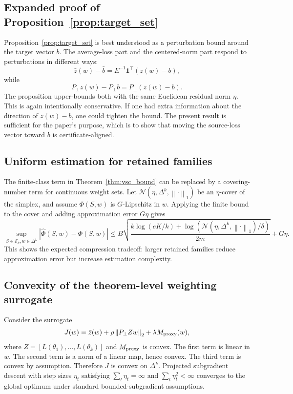 \documentclass{article}
\theoremstyle{definition}
\newcommand{\cN}{\mathcal{N}}
\newcommand{\cS}{\mathcal{S}}
\newcommand{\simplex}{\Delta}
\newcommand{\one}{\mathbf{1}}
\newcommand{\norm}[1]{\left\lVert #1 \right\rVert}
\newcommand{\abs}[1]{\left\lvert #1 \right\rvert}
\begin{document}
\subsection{Expanded proof of Proposition~\ref{prop:target_set}}

Proposition~\ref{prop:target_set} is best understood as a perturbation bound around the target vector \(b\). The average-loss part and the centered-norm part respond to perturbations in different ways:
\[
\bar z(w)-\bar b = E^{-1}\one^\top(z(w)-b),
\]
while
\[
P_\perp z(w)-P_\perp b = P_\perp(z(w)-b).
\]
The proposition upper-bounds both with the same Euclidean residual norm \(\eta\). This is again intentionally conservative. If one had extra information about the direction of \(z(w)-b\), one could tighten the bound. The present result is sufficient for the paper's purpose, which is to show that moving the source-loss vector toward \(b\) is certificate-aligned.

\subsection{Uniform estimation for retained families}

The finite-class term in Theorem~\ref{thm:vsc_bound} can be replaced by a covering-number term for continuous weight sets. Let \(\cN(\eta,\simplex^k,\norm{\cdot}_1)\) be an \(\eta\)-cover of the simplex, and assume \(\Phi(S,w)\) is \(G\)-Lipschitz in \(w\). Applying the finite bound to the cover and adding approximation error \(G\eta\) gives
\[
\sup_{S\in\cS_k,w\in\simplex^k}
\abs{\widehat\Phi(S,w)-\Phi(S,w)}
\le
B\sqrt{
\frac{k\log(eK/k)+\log(\cN(\eta,\simplex^k,\norm{\cdot}_1)/\delta)}{2m}
}
+G\eta.
\]
This shows the expected compression tradeoff: larger retained families reduce approximation error but increase estimation complexity.

\subsection{Convexity of the theorem-level weighting surrogate}

Consider the surrogate
\[
J(w)
=
\bar z(w)+\rho\norm{P_\perp Z w}_2+\lambda M_{\rm proxy}(w),
\]
where \(Z=[L(\theta_1),\dots,L(\theta_k)]\) and \(M_{\rm proxy}\) is convex. The first term is linear in \(w\). The second term is a norm of a linear map, hence convex. The third term is convex by assumption. Therefore \(J\) is convex on \(\simplex^k\). Projected subgradient descent with step sizes \(\eta_t\) satisfying \(\sum_t\eta_t=\infty\) and \(\sum_t\eta_t^2<\infty\) converges to the global optimum under standard bounded-subgradient assumptions.
\end{document}
